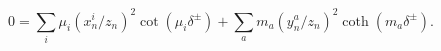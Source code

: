 \begin{equation}
\label{delta}
0 =
\sum_i \mu_i (x^i_n/z_n)^2 \cot(\mu_i  \delta^\pm) + 
\sum_a m_a (y^a_n/z_n)^2 \coth(m_a  \delta^\pm).  
\end{equation}

